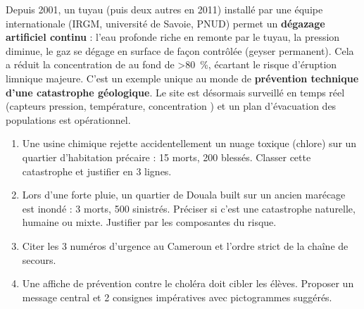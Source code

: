 \documentclass[11pt]{article}
\begin{document}
\begin{savaistu}
Depuis 2001, un tuyau (puis deux autres en 2011) installé par une équipe internationale (IRGM, université de Savoie, PNUD) permet un \textbf{dégazage artificiel continu} : l'eau profonde riche en  remonte par le tuyau, la pression diminue, le gaz se dégage en surface de façon contrôlée (geyser permanent). Cela a réduit la concentration de  au fond de \SI{>80}{\%}, écartant le risque d'éruption limnique majeure. C'est un exemple unique au monde de \textbf{prévention technique d'une catastrophe géologique}. Le site est désormais surveillé en temps réel (capteurs pression, température, concentration ) et un plan d'évacuation des populations est opérationnel.
\end{savaistu}

\begin{exercice}
\begin{enumerate}
\item Une usine chimique rejette accidentellement un nuage toxique (chlore) sur un quartier d'habitation précaire : 15 morts, 200 blessés. Classer cette catastrophe et justifier en 3 lignes.
\item Lors d'une forte pluie, un quartier de Douala built sur un ancien marécage est inondé : 3 morts, 500 sinistrés. Préciser si c'est une catastrophe naturelle, humaine ou mixte. Justifier par les composantes du risque.
\item Citer les 3 numéros d'urgence au Cameroun et l'ordre strict de la chaîne de secours.
\item Une affiche de prévention contre le choléra doit cibler les élèves. Proposer un message central et 2 consignes impératives avec pictogrammes suggérés.
\end{enumerate}
\end{exercice}
\end{document}
